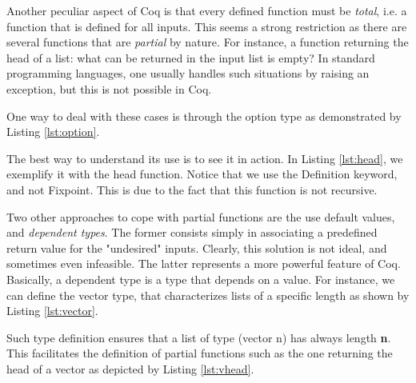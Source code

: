 	Another peculiar aspect of Coq is that every defined function must be \textit{total}, i.e.
	a function that is defined for all inputs. This seems a strong restriction as there are several
	functions that are \textit{partial} by nature. For instance, a function returning the head of a list:
	what can be returned in the input list is empty? In standard programming languages, one
	usually handles such situations by raising an exception, but this is not possible in Coq.
		
		One way to deal with these cases is through the \textsf{option} type as demonstrated
		by Listing \ref{lst:option}.
		
		
			
	\noindent The best way to understand its use is to see it in action. In Listing \ref{lst:head}, 
	we exemplify
	it with the \textsf{head} function. Notice that we use the \textsf{Definition} keyword, and
	not \textsf{Fixpoint}. This is due to the fact that this function is not recursive.

	

	\noindent Two other approaches to cope with partial functions are the use default values, and
	\textit{dependent types}. The former consists simply in associating a predefined return value for 
	the "undesired" inputs. Clearly, this solution is not ideal, and sometimes even infeasible.	 
	The latter represents a more powerful feature of Coq. Basically, a dependent type is 
	a type that depends on a value. For instance, we can define the \textsf{vector} type, 
	that characterizes lists of a specific length as shown by Listing \ref{lst:vector}.
	
	
	
	\noindent Such type definition ensures that a list of type \textsf{(vector n)} has
	always length \textbf{n}. This facilitates the definition of partial functions such as the
	one returning the head of a vector as depicted by Listing \ref{lst:vhead}.
	
	

